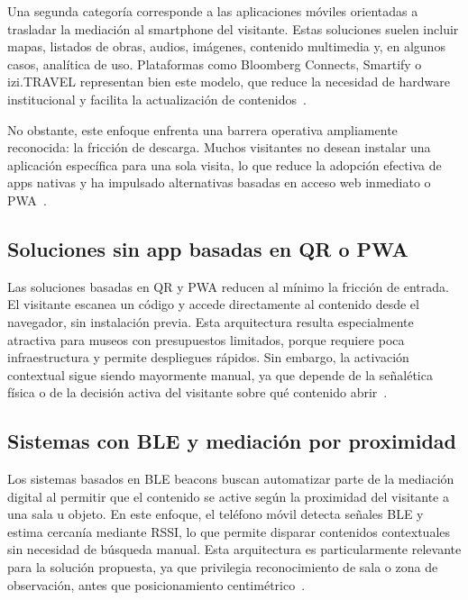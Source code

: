 Una segunda categoría corresponde a las aplicaciones móviles orientadas a trasladar la mediación al smartphone del visitante. Estas soluciones suelen incluir mapas, listados de obras, audios, imágenes, contenido multimedia y, en algunos casos, analítica de uso. Plataformas como Bloomberg Connects, Smartify o izi.TRAVEL representan bien este modelo, que reduce la necesidad de hardware institucional y facilita la actualización de contenidos~\cite{bloomberg2025connects,smartifyplatform,izitravelmuseum}.

No obstante, este enfoque enfrenta una barrera operativa ampliamente reconocida: la fricción de descarga. Muchos visitantes no desean instalar una aplicación específica para una sola visita, lo que reduce la adopción efectiva de apps nativas y ha impulsado alternativas basadas en acceso web inmediato o PWA~\cite{sala2025museumapps,smartifypwa,nubartpwa}.

\subsection{Soluciones sin app basadas en QR o PWA}

Las soluciones basadas en QR y PWA reducen al mínimo la fricción de entrada. El visitante escanea un código y accede directamente al contenido desde el navegador, sin instalación previa. Esta arquitectura resulta especialmente atractiva para museos con presupuestos limitados, porque requiere poca infraestructura y permite despliegues rápidos. Sin embargo, la activación contextual sigue siendo mayormente manual, ya que depende de la señalética física o de la decisión activa del visitante sobre qué contenido abrir~\cite{izitravelmuseum,nubartpwa,hearonymusaccessibility}.

\subsection{Sistemas con BLE y mediación por proximidad}

Los sistemas basados en BLE beacons buscan automatizar parte de la mediación digital al permitir que el contenido se active según la proximidad del visitante a una sala u objeto. En este enfoque, el teléfono móvil detecta señales BLE y estima cercanía mediante RSSI, lo que permite disparar contenidos contextuales sin necesidad de búsqueda manual. Esta arquitectura es particularmente relevante para la solución propuesta, ya que privilegia reconocimiento de sala o zona de observación, antes que posicionamiento centimétrico~\cite{verde2023blemuseum,appleibeacon,googleeddystone,espressifibeacon}.

